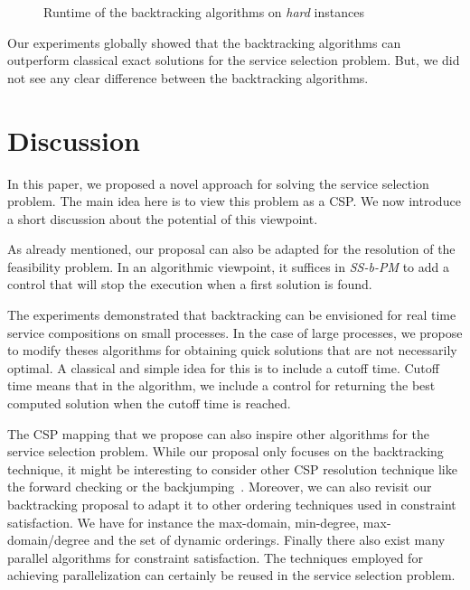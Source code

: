\documentclass[a4paper]{article}
\begin{document}
\begin{figure}[ht]
\centering
{}

\caption{Runtime of the backtracking algorithms on {\it hard} instances}
\label{Time-ss-b}
\end{figure}

Our experiments globally showed that the backtracking algorithms can outperform classical 
exact solutions for the service selection problem. But, we did not see any clear 
difference between the backtracking algorithms. 


\section{Discussion} \label{Discussion}

In this paper, we proposed a novel approach for solving the service selection problem. 
The main idea here is to view this problem as a CSP. We now introduce a short discussion 
about the potential of this viewpoint. 


As already mentioned, our proposal can also be adapted for the resolution of the 
feasibility problem. In an algorithmic viewpoint, it suffices in {\it SS-b-PM} to add 
a control that will stop the execution when a first solution is found. 

The experiments demonstrated that 
backtracking can be envisioned for real time service compositions on small processes. 
In the case of large processes, we propose to modify theses algorithms for obtaining quick solutions  
that are not necessarily optimal. A classical and simple idea for this is 
to include a cutoff time. Cutoff time means that in the algorithm, we include a control for returning 
the best computed solution when the cutoff time is reached. 

The CSP mapping that we propose can also inspire other algorithms for the service 
selection problem. While our proposal only focuses on the backtracking technique, it might
be interesting to consider other CSP resolution technique like the forward checking or the 
backjumping~\cite{Baker95intelligentbacktracking}. Moreover, we can also revisit our 
backtracking proposal to adapt it to other ordering techniques used in constraint 
satisfaction. We have for instance the max-domain, min-degree, max-domain/degree and 
the set of dynamic orderings. Finally there also exist many parallel algorithms for 
constraint satisfaction. The techniques employed for achieving parallelization can certainly 
be reused in the service selection problem.
\end{document}
